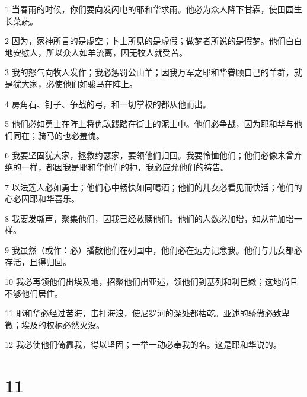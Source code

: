 \par 1 当春雨的时候，你们要向发闪电的耶和华求雨。他必为众人降下甘霖，使田园生长菜蔬。
\par 2 因为，家神所言的是虚空；卜士所见的是虚假；做梦者所说的是假梦。他们白白地安慰人，所以众人如羊流离，因无牧人就受苦。
\par 3 我的怒气向牧人发作；我必惩罚公山羊；因我万军之耶和华眷顾自己的羊群，就是犹大家，必使他们如骏马在阵上。
\par 4 房角石、钉子、争战的弓，和一切掌权的都从他而出。
\par 5 他们必如勇士在阵上将仇敌践踏在街上的泥土中。他们必争战，因为耶和华与他们同在；骑马的也必羞愧。
\par 6 我要坚固犹大家，拯救约瑟家，要领他们归回。我要怜恤他们；他们必像未曾弃绝的一样，都因我是耶和华他们的神，我必应允他们的祷告。
\par 7 以法莲人必如勇士；他们心中畅快如同喝酒；他们的儿女必看见而快活；他们的心必因耶和华喜乐。
\par 8 我要发嘶声，聚集他们，因我已经救赎他们。他们的人数必加增，如从前加增一样。
\par 9 我虽然（或作：必）播散他们在列国中，他们必在远方记念我。他们与儿女都必存活，且得归回。
\par 10 我必再领他们出埃及地，招聚他们出亚述，领他们到基列和利巴嫩；这地尚且不够他们居住。
\par 11 耶和华必经过苦海，击打海浪，使尼罗河的深处都枯乾。亚述的骄傲必致卑微；埃及的权柄必然灭没。
\par 12 我必使他们倚靠我，得以坚固；一举一动必奉我的名。这是耶和华说的。

\chapter{11}

